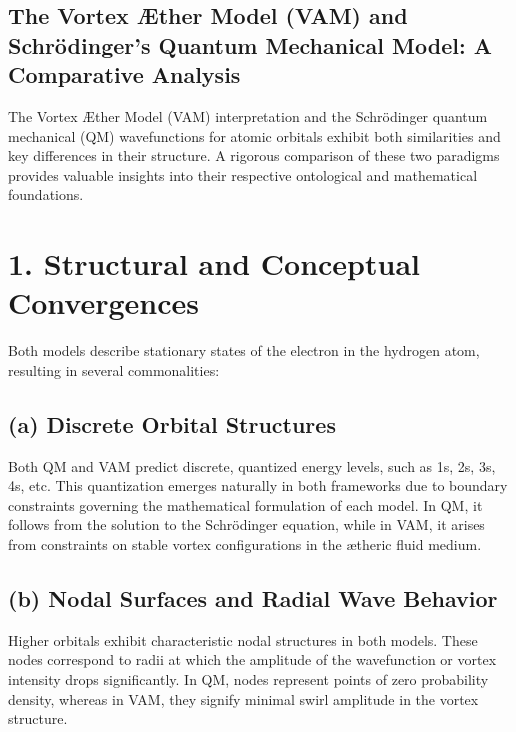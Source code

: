 

\subsection{The Vortex Æther Model (VAM) and Schrödinger's Quantum Mechanical Model: A Comparative Analysis}

The Vortex Æther Model (VAM) interpretation and the Schrödinger quantum mechanical (QM) wavefunctions for atomic orbitals exhibit both similarities and key differences in their structure. A rigorous comparison of these two paradigms provides valuable insights into their respective ontological and mathematical foundations.


\section*{1. Structural and Conceptual Convergences}

Both models describe stationary states of the electron in the hydrogen atom, resulting in several commonalities:

\subsection*{(a) Discrete Orbital Structures}

Both QM and VAM predict discrete, quantized energy levels, such as 1s, 2s, 3s, 4s, etc. This quantization emerges naturally in both frameworks due to boundary constraints governing the mathematical formulation of each model. In QM, it follows from the solution to the Schrödinger equation, while in VAM, it arises from constraints on stable vortex configurations in the ætheric fluid medium.

\subsection*{(b) Nodal Surfaces and Radial Wave Behavior}

Higher orbitals exhibit characteristic nodal structures in both models. These nodes correspond to radii at which the amplitude of the wavefunction or vortex intensity drops significantly. In QM, nodes represent points of zero probability density, whereas in VAM, they signify minimal swirl amplitude in the vortex structure.

